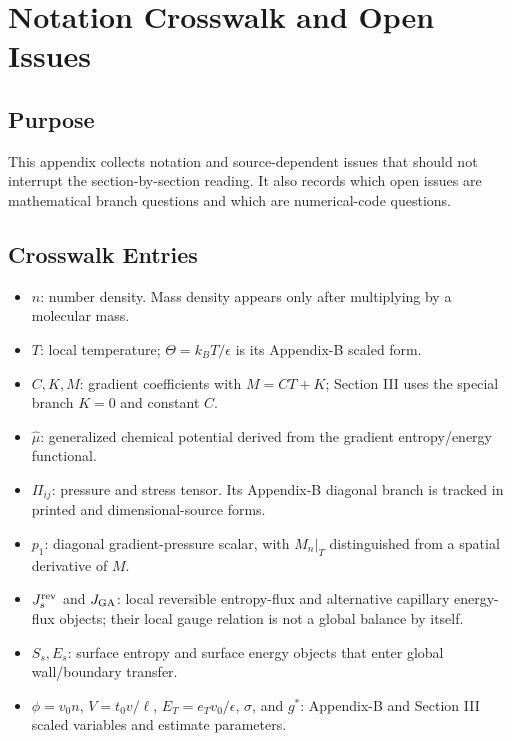 \section{Notation Crosswalk and Open Issues}
\label{app:crosswalk-open-issues}


\subsection*{Purpose}

This appendix collects notation and source-dependent issues that should not
interrupt the section-by-section reading.  It also records which open issues are
mathematical branch questions and which are numerical-code questions.

\subsection*{Crosswalk Entries}

\begin{itemize}
\item \(n\): number density.  Mass density appears only after multiplying by a
  molecular mass.
\item \(T\): local temperature; \(\Theta=k_BT/\epsilon\) is its Appendix-B scaled
  form.
\item \(C,K,M\): gradient coefficients with \(M=CT+K\); Section III uses the
  special branch \(K=0\) and constant \(C\).
\item \(\hat\mu\): generalized chemical potential derived from the gradient
  entropy/energy functional.
\item \(\Pi_{ij}\): pressure and stress tensor.  Its Appendix-B diagonal
  branch is tracked in printed and dimensional-source forms.
\item \(p_1\): diagonal gradient-pressure scalar, with \(M_n|_T\) distinguished
  from a spatial derivative of \(M\).
\item \(J_s^{\rm rev}\) and \(J_{\rm GA}\): local reversible entropy-flux and
  alternative capillary energy-flux objects; their local gauge relation is not a
  global balance by itself.
\item \(S_s,E_s\): surface entropy and surface energy objects that enter global
  wall/boundary transfer.
\item \(\phi=v_0n\), \(V=t_0v/\ell\), \(E_T=e_Tv_0/\epsilon\), \(\sigma\), and
  \(g^*\): Appendix-B and Section III scaled variables and estimate parameters.
\end{itemize}


